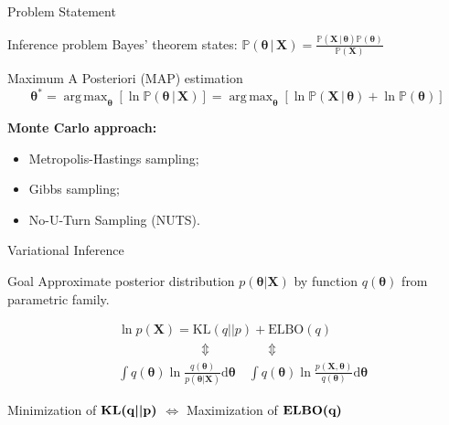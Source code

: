 \documentclass{beamer}
\DeclareMathOperator*{\argmax}{arg\,max}
\begin{document}
\begin{frame}{Problem Statement}
	\begin{block}{Inference problem}
			Bayes' theorem states:
			$\displaystyle
			\mathbb{P}(\bm{\theta}\,|\,\mathbf{X}) = \frac{\mathbb{P}(\mathbf{X}\,|\,\bm{\theta}) \mathbb{P}(\bm{\theta})}{\mathbb{P}(\mathbf{X})}
			$
	\end{block}
	\begin{block}{Maximum A Posteriori (MAP) estimation}
		\vspace{-0.3cm}
	\[
	\bm{\theta}^* = \argmax_{\bm{\theta}} \left[\ln\mathbb{P}(\bm{\theta}\,|\,\mathbf{X})\right] =\argmax_{\bm{\theta}} \left[\ln\mathbb{P}(\mathbf{X}\,|\,\bm{\theta}) + \ln\mathbb{P}(\bm{\theta})\right]
	\]
	\end{block}
	\vfill
	\textbf{Monte Carlo approach:}
	\begin{itemize}
		\item Metropolis-Hastings sampling;
		\item Gibbs sampling;
		\item No-U-Turn Sampling (NUTS).
	\end{itemize}
\end{frame}
\begin{frame}{Variational Inference}
	\begin{block}{Goal}
	Approximate posterior distribution $p(\bm{\theta}|\bm{X})$ by function $q(\bm{\theta})$ from parametric family.
	\end{block}
	\begin{align*}
		&\ln p(\mathbf{X}) = \text{KL}(q||p) + \text{ELBO}(q)\\
		&\qquad\qquad\:\qquad\Updownarrow\qquad\qquad\Updownarrow\\
		&\int q(\bm{\theta}) \ln \frac{q(\bm{\theta})}{p(\bm{\theta}|\mathbf{X})} \text{d}\bm{\theta}
	\quad
		\int q(\bm{\theta}) \ln \frac{p(\mathbf{X}, \bm{\theta})}{q(\bm{\theta})} \text{d}\bm{\theta}
	\end{align*}
	\vspace{-0.3cm}
	\begin{block}{}
		\begin{center}
			Minimization of $\mathbf{\text{\textbf{KL}}\bm{(}q\bm{||}p\bm{)}}$ $\bm\Leftrightarrow$ Maximization of $\mathbf{\text{\textbf{ELBO}}\bm{(}q\bm{)}}$			
		\end{center}
	\end{block}
\end{frame}
\end{document}
